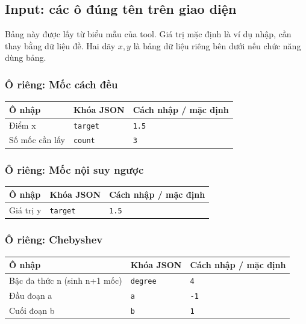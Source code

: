 \subsection*{Input: các ô đúng tên trên giao diện}
Bảng này được lấy từ biểu mẫu của tool. Giá trị mặc định là ví dụ nhập, cần thay bằng dữ liệu đề. Hai dãy $x,y$ là bảng dữ liệu riêng bên dưới nếu chức năng dùng bảng.
\subsubsection*{Ô riêng: Mốc cách đều}
\begin{center}\small\begin{tabular}{@{}p{.32\linewidth}p{.17\linewidth}p{.43\linewidth}@{}}\toprule
Ô nhập & Khóa JSON & Cách nhập / mặc định\\\midrule
Điểm x & \texttt{target} & \texttt{1.5}\\[3pt]
Số mốc cần lấy & \texttt{count} & \texttt{3}\\[3pt]
\bottomrule\end{tabular}\end{center}
\subsubsection*{Ô riêng: Mốc nội suy ngược}
\begin{center}\small\begin{tabular}{@{}p{.32\linewidth}p{.17\linewidth}p{.43\linewidth}@{}}\toprule
Ô nhập & Khóa JSON & Cách nhập / mặc định\\\midrule
Giá trị y & \texttt{target} & \texttt{1.5}\\[3pt]
\bottomrule\end{tabular}\end{center}
\subsubsection*{Ô riêng: Chebyshev}
\begin{center}\small\begin{tabular}{@{}p{.32\linewidth}p{.17\linewidth}p{.43\linewidth}@{}}\toprule
Ô nhập & Khóa JSON & Cách nhập / mặc định\\\midrule
Bậc đa thức n (sinh n+1 mốc) & \texttt{degree} & \texttt{4}\\[3pt]
Đầu đoạn a & \texttt{a} & \texttt{-1}\\[3pt]
Cuối đoạn b & \texttt{b} & \texttt{1}\\[3pt]
\bottomrule\end{tabular}\end{center}
